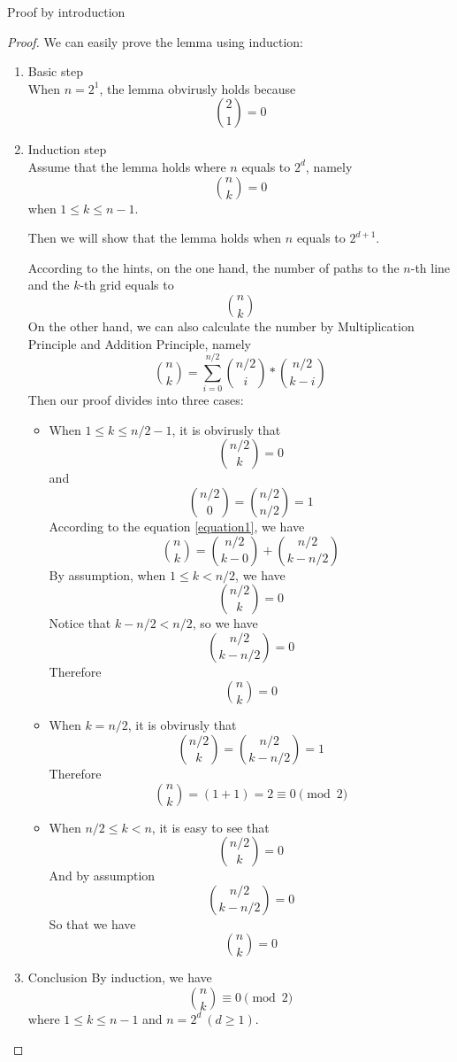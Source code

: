 \item Proof by introduction
\begin{proof}
We can easily prove the lemma using induction:
\begin{enumerate}
    \item Basic step\\
    When $\displaystyle n = 2^1$, the lemma obvirusly holds because
	\[\binom{2}{1} = 0\]
    \item Induction step\\
    Assume that the lemma holds where $n$ equals to $2^d$, namely
	\[\binom{n}{k} = 0\]
	when $1 \leq k \leq n - 1$.

	Then we will show that the lemma holds when $n$ equals to $2^{d + 1}$.

	According to the hints, on the one hand, the number of paths to the $n$-th line and the $k$-th grid equals to
	\[\binom{n}{k}\]
	On the other hand, we can also calculate the number by Multiplication Principle and Addition Principle, namely
	\begin{equation}\label{equation1}
	\binom{n}{k} = \sum_{i = 0}^{n / 2} \binom{n / 2}{i} * \binom{n / 2}{k - i}
	\end{equation}
	Then our proof divides into three cases:
	\begin{itemize}
		\item When $1 \leq k \leq n / 2 - 1$, it is obvirusly that
		\[\binom{n / 2}{k} = 0\]
		and
		\[\binom{n / 2}{0} = \binom{n / 2}{n / 2} = 1\]
		According to the equation \eqref{equation1}, we have
		\[\binom{n}{k} = \binom{n / 2}{k - 0} + \binom{n / 2}{k - n / 2}\]
		 By assumption, when $1 \leq k < n / 2$, we have
		\[\binom{n / 2}{k} = 0\]
		Notice that $k - n / 2 < n / 2$, so we have
		\[\binom{n / 2}{k - n / 2} = 0\]
		Therefore \[\displaystyle \binom{n}{k} = 0\]
		\item
		When $k = n / 2$, it is obvirusly that
		\[\binom{n / 2}{k} = \binom{n / 2}{k - n / 2} = 1\]
		Therefore
		\[\binom{n}{k} = (1 + 1) = 2 \equiv 0 \pmod{2}\]
		\item
		When $n / 2 \leq k < n$, it is easy to see that
		\[\binom{n / 2}{k} = 0\]
		And by assumption
		\[\binom{n / 2}{k - n / 2} = 0\]
		So that we have
		\[\binom{n}{k} = 0\]
	\end{itemize}

    \item Conclusion
	By induction, we have
    \[\binom{n}{k} \equiv 0 \pmod{2}\]
	where $1 \leq k \leq n - 1$ and $n = 2^d~(d \geq 1)$.
\end{enumerate}
\end{proof}
